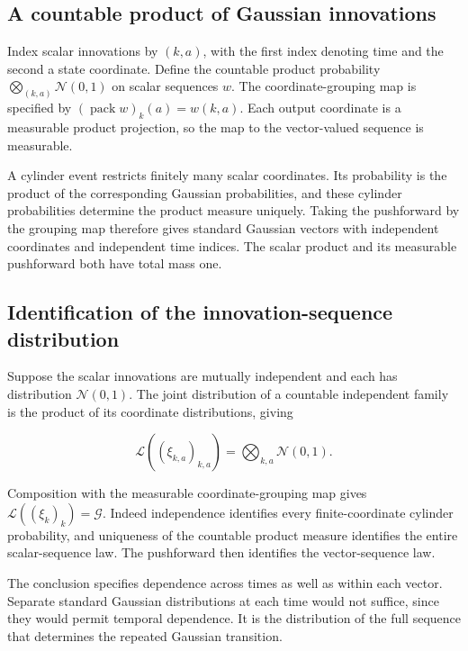\documentclass[11pt,a4paper]{article}
\begin{document}
\subsection{\texorpdfstring{A countable product of Gaussian innovations}{A countable product of Gaussian innovations}}


Index scalar innovations by \((k,a)\), with the first index denoting time and the second a state coordinate. Define the countable product probability \(\bigotimes_{(k,a)}\mathcal N(0,1)\) on scalar sequences \(w\). The coordinate-grouping map is specified by \((\operatorname{pack}w)_k(a)=w(k,a)\). Each output coordinate is a measurable product projection, so the map to the vector-valued sequence is measurable.



A cylinder event restricts finitely many scalar coordinates. Its probability is the product of the corresponding Gaussian probabilities, and these cylinder probabilities determine the product measure uniquely. Taking the pushforward by the grouping map therefore gives standard Gaussian vectors with independent coordinates and independent time indices. The scalar product and its measurable pushforward both have total mass one.




\subsection{\texorpdfstring{Identification of the innovation-sequence distribution}{Identification of the innovation-sequence distribution}}


Suppose the scalar innovations are mutually independent and each has distribution \(\mathcal N(0,1)\). The joint distribution of a countable independent family is the product of its coordinate distributions, giving

\[\mathcal L((\xi_{k,a})_{k,a})=\bigotimes_{k,a}\mathcal N(0,1).\]

Composition with the measurable coordinate-grouping map gives \(\mathcal L((\xi_k)_k)=\mathcal G\). Indeed independence identifies every finite-coordinate cylinder probability, and uniqueness of the countable product measure identifies the entire scalar-sequence law. The pushforward then identifies the vector-sequence law.



The conclusion specifies dependence across times as well as within each vector. Separate standard Gaussian distributions at each time would not suffice, since they would permit temporal dependence. It is the distribution of the full sequence that determines the repeated Gaussian transition.
\end{document}
